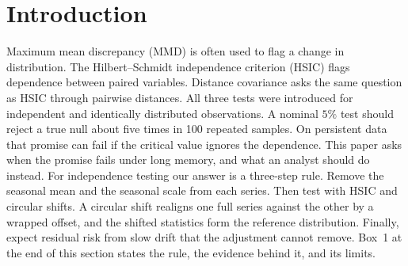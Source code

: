 
\section{Introduction}
Maximum mean discrepancy (MMD) \citep{gretton2012kernel} is often used to flag a change in distribution. The Hilbert--Schmidt independence criterion (HSIC) \citep{gretton2008kernel} flags dependence between paired variables. Distance covariance \citep{szekely2007dcov} asks the same question as HSIC through pairwise distances. All three tests were introduced for independent and identically distributed observations. A nominal $5\%$ test should reject a true null about five times in 100 repeated samples. On persistent data that promise can fail if the critical value ignores the dependence. This paper asks when the promise fails under long memory, and what an analyst should do instead. For independence testing our answer is a three-step rule. Remove the seasonal mean and the seasonal scale from each series. Then test with HSIC and circular shifts. A circular shift realigns one full series against the other by a wrapped offset, and the shifted statistics form the reference distribution. Finally, expect residual risk from slow drift that the adjustment cannot remove. Box~1 at the end of this section states the rule, the evidence behind it, and its limits.


